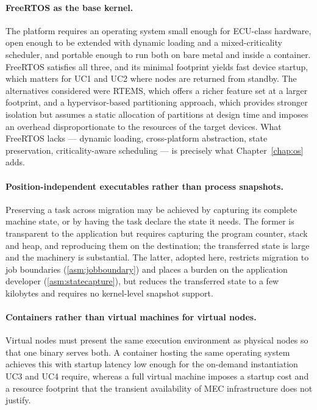 \paragraph{FreeRTOS as the base kernel.}
The platform requires an operating system small enough for ECU-class hardware,
open enough to be extended with dynamic loading and a mixed-criticality
scheduler, and portable enough to run both on bare metal and inside a
container. FreeRTOS satisfies all three, and its minimal footprint yields fast
device startup, which matters for UC1 and UC2 where nodes are returned from
standby. The alternatives considered were RTEMS, which offers a richer
feature set at a larger footprint, and a hypervisor-based partitioning
approach, which provides stronger isolation but assumes a static allocation of
partitions at design time and imposes an overhead disproportionate to the
resources of the target devices. What FreeRTOS lacks --- dynamic loading,
cross-platform abstraction, state preservation, criticality-aware scheduling
--- is precisely what Chapter~\ref{chap:os} adds.

\paragraph{Position-independent executables rather than process snapshots.}
Preserving a task across migration may be achieved by capturing its complete
machine state, or by having the task declare the state it needs. The former is
transparent to the application but requires capturing the program counter,
stack and heap, and reproducing them on the destination; the transferred state
is large and the machinery is substantial. The latter, adopted here, restricts
migration to job boundaries (\cref{asm:jobboundary}) and places a burden on the
application developer (\cref{asm:statecapture}), but reduces the transferred
state to a few kilobytes and requires no kernel-level snapshot support.

\paragraph{Containers rather than virtual machines for virtual nodes.}
Virtual nodes must present the same execution environment as physical nodes so
that one binary serves both. A container hosting the same operating system
achieves this with startup latency low enough for the on-demand instantiation
UC3 and UC4 require, whereas a full virtual machine imposes a startup cost and
a resource footprint that the transient availability of MEC infrastructure does
not justify.

